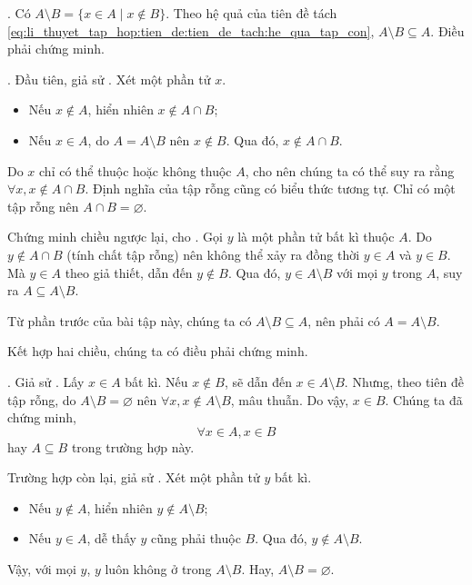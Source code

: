 \solution

\setcounter{subexercise}{1}
. Có $A \setminus B = \{x \in A \mid x \notin B\}$. Theo hệ quả của tiên đề tách \eqref{eq:li_thuyet_tap_hop:tien_de:tien_de_tach:he_qua_tap_con}, $A \setminus B \subseteq A$. Điều phải chứng minh.

. Đầu tiên, giả sử . Xét một phần tử $x$.
\begin{itemize}
   \item Nếu $x \notin A$, hiển nhiên $x \notin A \cap B$;
   \item Nếu $x \in A$, do $A = A \setminus B$ nên $x \notin B$. Qua đó, $x \notin A \cap B$.
\end{itemize}
Do $x$ chỉ có thể thuộc hoặc không thuộc $A$, cho nên chúng ta có thể suy ra rằng $\forall x, x \notin A \cap B$. Định nghĩa của tập rỗng cũng có biểu thức tương tự. Chỉ có một tập rỗng nên $A \cap B = \varnothing$.

Chứng minh chiều ngược lại, cho . Gọi $y$ là một phần tử bất kì thuộc $A$. Do $y \notin A \cap B$ (tính chất tập rỗng) nên không thể xảy ra đồng thời $y \in A$ và $y \in B$. Mà $y \in A$ theo giả thiết, dẫn đến $y \notin B$. Qua đó, $y \in A \setminus B$ với mọi $y$ trong $A$, suy ra $A \subseteq A\setminus B$.

Từ phần trước của bài tập này, chúng ta có $A\setminus B \subseteq A$, nên phải có $A = A \setminus B$. 

Kết hợp hai chiều, chúng ta có điều phải chứng minh.

. Giả sử . Lấy $x \in A$ bất kì. Nếu $x \notin B$, sẽ dẫn đến $x \in A \setminus B$. Nhưng, theo tiên đề tập rỗng, do $A \setminus B = \varnothing$ nên $\forall x, x \notin A \setminus B$, mâu thuẫn. Do vậy, $x \in B$. Chúng ta đã chứng minh, $$\forall x \in A, x \in B$$ hay $A \subseteq B$ trong trường hợp này.

Trường hợp còn lại, giả sử . Xét một phần tử $y$ bất kì.
\begin{itemize}
   \item Nếu $y \notin A$, hiển nhiên $y \notin A \setminus B$;
   \item Nếu $y \in A$, dễ thấy $y$ cũng phải thuộc $B$. Qua đó, $y \notin A \setminus B$.
\end{itemize}
Vậy, với mọi $y$, $y$ luôn không ở trong $A \setminus B$. Hay, $A \setminus B = \varnothing$.

